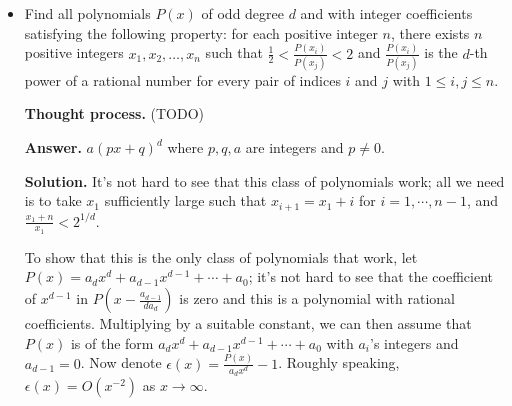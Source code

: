 \documentclass[11pt,a4paper]{article}
\begin{document}
\begin{itemize}
\item[\textbf{N8.}] Find all polynomials $P(x)$ of odd degree $d$ and with integer coefficients satisfying the following property: for each positive integer $n$, there exists $n$ positive integers $x_1, x_2, \ldots, x_n$ such that $\frac12 < \frac{P(x_i)}{P(x_j)} < 2$ and $\frac{P(x_i)}{P(x_j)}$ is the $d$-th power of a rational number for every pair of indices $i$ and $j$ with $1 \leq i, j \leq n$.

\textbf{Thought process.} 
(TODO)

\textbf{Answer.} $a(px+q)^d$ where $p, q, a$ are integers and $p\neq 0$. 

\textbf{Solution.} It's not hard to see that this class of polynomials work; 
all we need is to take $x_1$ sufficiently large such that $x_{i+1}=x_1+i$ for $i=1, \cdots, n - 1$, 
and $\frac{x_1+n}{x_1} < 2^{1/d}$. 

To show that this is the only class of polynomials that work, let $P(x)=a_dx^d+a_{d-1}x^{d-1}+\cdots + a_0$; 
it's not hard to see that the coefficient of $x^{d-1}$ in $P(x - \frac{a_{d-1}}{da_d})$ is zero and this is a polynomial with rational coefficients. 
Multiplying by a suitable constant, we can then assume that $P(x)$ is of the form $a_dx^d+a_{d-1}x^{d-1}+\cdots + a_0$ with $a_i$'s integers and $a_{d-1}=0$. 
Now denote $\epsilon(x) = \frac{P(x)}{a_dx^d}-1$. Roughly speaking, $\epsilon(x)=O(x^{-2})$ as $x\to\infty$. 


\end{itemize}
\end{document}
